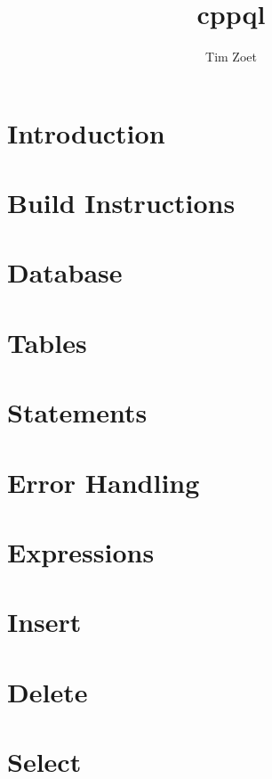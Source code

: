 \documentclass[twoside,a4paper,smallborder=true]{refart}
\title{cppql}
\author{Tim Zoet}
\date{}
\begin{document}
\maketitle

\tableofcontents
\newpage

\section{Introduction}
\label{section:introduction}

\newpage

\section{Build Instructions}
\label{section:build}

\newpage

\section{Database}
\label{section:database}

\newpage

\section{Tables}
\label{section:tables}

\newpage

\section{Statements}
\label{section:statements}

\newpage

\section{Error Handling}
\label{section:errors}

\newpage

\section{Expressions}
\label{section:expressions}

\newpage

\section{Insert}
\label{section:insert}

\newpage

\section{Delete}
\label{section:delete}

\newpage

\section{Select}
\label{section:select}

\newpage

 
 
\printindex
\end{document}
